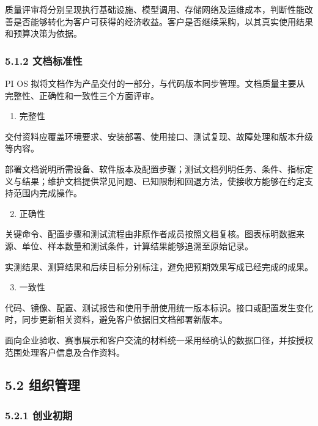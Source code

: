 质量评审将分别呈现执行基础设施、模型调用、存储网络及运维成本，判断性能改善是否能够转化为客户可获得的经济收益。客户是否继续采购，以其真实使用结果和预算决策为依据。

\subsubsection{5.1.2 文档标准性}\label{ux6587ux6863ux6807ux51c6ux6027}

PI OS 拟将文档作为产品交付的一部分，与代码版本同步管理。文档质量主要从完整性、正确性和一致性三个方面评审。

\begin{enumerate}

\item
  完整性
\end{enumerate}

交付资料应覆盖环境要求、安装部署、使用接口、测试复现、故障处理和版本升级等内容。

部署文档说明所需设备、软件版本及配置步骤；测试文档列明任务、条件、指标定义与结果；维护文档提供常见问题、已知限制和回退方法，使接收方能够在约定支持范围内完成操作。

\begin{enumerate}

\setcounter{enumi}{1}
\item
  正确性
\end{enumerate}

关键命令、配置步骤和测试流程由非原作者成员按照文档复核。图表标明数据来源、单位、样本数量和测试条件，计算结果能够追溯至原始记录。

实测结果、测算结果和后续目标分别标注，避免把预期效果写成已经完成的成果。

\begin{enumerate}

\setcounter{enumi}{2}
\item
  一致性
\end{enumerate}

代码、镜像、配置、测试报告和使用手册使用统一版本标识。接口或配置发生变化时，同步更新相关资料，避免客户依据旧文档部署新版本。

面向企业验收、赛事展示和客户交流的材料统一采用经确认的数据口径，并按授权范围处理客户信息及合作资料。

\subsection{5.2 组织管理}\label{ux7ec4ux7ec7ux7ba1ux7406}

\subsubsection{5.2.1 创业初期}\label{ux521bux4e1aux521dux671f}

